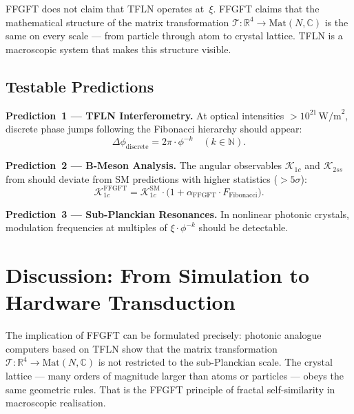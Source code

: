 \begin{keybox}
FFGFT does not claim that TFLN operates at~$\xi$. FFGFT claims that
the mathematical structure of the matrix transformation
$\mathcal{T}: \mathbb{R}^4 \to \mathrm{Mat}(N,\mathbb{C})$
is the same on every scale — from particle through atom to crystal
lattice. TFLN is a macroscopic system that makes this structure
visible.
\end{keybox}

\subsection{Testable Predictions}

\begin{predbox}
\textbf{Prediction~1 — TFLN Interferometry.}
At optical intensities $> 10^{21}\,\text{W/m}^2$, discrete phase jumps
following the Fibonacci hierarchy should appear:
\[
  \Delta\phi_{\text{discrete}} = 2\pi \cdot \phi^{-k} \quad (k \in \mathbb{N}).
\]
\end{predbox}

\begin{predbox}
\textbf{Prediction~2 — B-Meson Analysis.}
The angular observables $\mathcal{K}_{1c}$ and $\mathcal{K}_{2ss}$ from
\cite{Arslan2026} should deviate from SM predictions with higher
statistics ($> 5\sigma$):
\[
  \mathcal{K}_{1c}^{\text{FFGFT}}
  = \mathcal{K}_{1c}^{\text{SM}}
    \cdot \bigl(1 + \alpha_{\text{FFGFT}} \cdot F_{\text{Fibonacci}}\bigr).
\]
\end{predbox}

\begin{predbox}
\textbf{Prediction~3 — Sub-Planckian Resonances.}
In nonlinear photonic crystals, modulation frequencies at multiples of
$\xi\cdot\phi^{-k}$ should be detectable.
\end{predbox}

\section{Discussion: From Simulation to Hardware Transduction}

The implication of FFGFT can be formulated precisely: photonic analogue
computers based on TFLN show that the matrix transformation
$\mathcal{T}: \mathbb{R}^4 \to \mathrm{Mat}(N,\mathbb{C})$
is not restricted to the sub-Planckian scale. The crystal lattice
— many orders of magnitude larger than atoms or particles — obeys
the same geometric rules. That is the FFGFT principle of fractal
self-similarity in macroscopic realisation.


